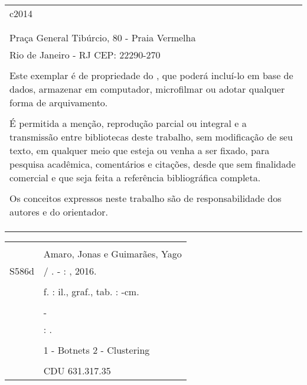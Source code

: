 \begin{fichacatalografica}
	\begin{tabular}{@{\hspace{0cm}}p{14.8cm}}
	c2014\\
	\\
	\imprimirinstituicao\\
	Praça General Tibúrcio, 80 - Praia Vermelha\\
	Rio de Janeiro - RJ \hspace{1.5cm} CEP: 22290-270\\
	\\
	Este exemplar é de propriedade do \imprimirinstituicao, que poderá incluí-lo em base de dados, armazenar em computador, microfilmar ou adotar qualquer forma de arquivamento.\\
	\\
	É permitida a menção, reprodução parcial ou integral e a transmissão entre bibliotecas deste trabalho, sem modificação de seu texto, em qualquer meio que esteja ou venha a ser fixado, para pesquisa acadêmica, comentários e citações, desde que sem finalidade comercial e que seja feita a referência bibliográfica completa.\\
	\\
	Os conceitos expressos neste trabalho são de responsabilidade dos autores e do orientador.\\
	\\
	\\
	\\
	\end{tabular}

	\small
	\begin{center}
	\begin{tabular}{|cp{13cm}|} \hline
		\hspace{1.3cm} & \\
		& Amaro, Jonas e Guimarães, Yago \\
		\hspace{0.2cm} S586d & \hspace{0.3cm} \imprimirtitulo{} / \imprimirautor. - \imprimirlocal: \imprimirinstituicao, 2016. \\
		& \\
		& \hspace{0.65cm} \pageref{Lastpage}f. : il., graf., tab. : -cm. \\
		& \\
		& \hspace{0.6cm} \imprimirtipotrabalho{} - \imprimirinstituicao \\
		& \hspace{0.6cm} \imprimirorientadorRotulo: \imprimirorientador.\\
		& \\
		& \hspace{0.6cm} 1 - Botnets \hspace{0.1cm} 2 - Clustering\\
		
		& \\ 
		& \hspace{9.75cm} CDU 631.317.35 \\
		\hline
	\end{tabular}
	\end{center}
\end{fichacatalografica}